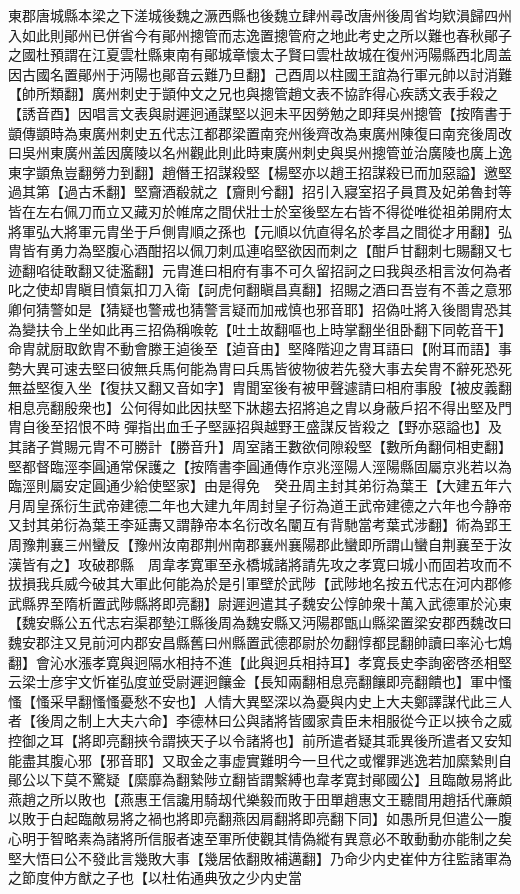 東郡唐城縣本梁之下溠城後魏之㵐西縣也後魏立肆州尋改唐州後周省均欵溳歸四州入如此則鄖州已併省今有鄖州摠管而志逸置摠管府之地此考史之所以難也春秋鄖子之國杜預謂在江夏雲杜縣東南有鄖城章懷太子賢曰雲杜故城在復州沔陽縣西北周盖因古國名置鄖州于沔陽也鄖音云難乃旦翻】己酉周以柱國王誼為行軍元帥以討消難【帥所類翻】廣州刺史于顗仲文之兄也與摠管趙文表不協詐得心疾誘文表手殺之【誘音酉】因唱言文表與尉遲迥通謀堅以迥未平因勞勉之即拜吳州摠管【按隋書于顗傳顗時為東廣州刺史五代志江都郡梁置南兖州後齊改為東廣州陳復曰南兖後周改曰吳州東廣州盖因廣陵以名州觀此則此時東廣州刺史與吳州摠管並治廣陵也廣上逸東字顗魚豈翻勞力到翻】趙僭王招謀殺堅【楊堅亦以趙王招謀殺已而加惡謚】邀堅過其第【過古禾翻】堅齎酒殽就之【齎則兮翻】招引入寢室招子員貫及妃弟魯封等皆在左右佩刀而立又藏刃於帷席之間伏壯士於室後堅左右皆不得從唯從祖弟開府太將軍弘大將軍元胄坐于戶側胄順之孫也【元順以伉直得名於孝昌之間從才用翻】弘胄皆有勇力為堅腹心酒酣招以佩刀刺瓜連啗堅欲因而刺之【酣戶甘翻刺七賜翻又七迹翻啗徒敢翻又徒濫翻】元胄進曰相府有事不可久留招訶之曰我與丞相言汝何為者叱之使却胄瞋目憤氣扣刀入衛【訶虎何翻瞋昌真翻】招賜之酒曰吾豈有不善之意邪卿何猜警如是【猜疑也警戒也猜警言疑而加戒慎也邪音耶】招偽吐將入後閤胄恐其為變扶令上坐如此再三招偽稱㗋乾【吐土故翻嘔也上時掌翻坐徂卧翻下同乾音干】命胄就厨取飲胄不動會滕王逌後至【逌音由】堅降階迎之胄耳語曰【附耳而語】事勢大異可速去堅曰彼無兵馬何能為胄曰兵馬皆彼物彼若先發大事去矣胄不辭死恐死無益堅復入坐【復扶又翻又音如字】胄聞室後有被甲聲遽請曰相府事殷【被皮義翻相息亮翻殷衆也】公何得如此因扶堅下牀趨去招將追之胄以身蔽戶招不得出堅及門胄自後至招恨不時彈指出血壬子堅誣招與越野王盛謀反皆殺之【野亦惡謚也】及其諸子賞賜元胄不可勝計【勝音升】周室諸王數欲伺隙殺堅【數所角翻伺相吏翻】堅都督臨涇李圓通常保護之【按隋書李圓通傳作京兆涇陽人涇陽縣固屬京兆若以為臨涇則屬安定圓通少給使堅家】由是得免　癸丑周主封其弟衍為葉王【大建五年六月周皇孫衍生武帝建德二年也大建九年周封皇子衍為道王武帝建德之六年也今静帝又封其弟衍為葉王李延夀又謂静帝本名衍改名闡互有背馳當考葉式涉翻】術為郢王　周豫荆襄三州蠻反【豫州汝南郡荆州南郡襄州襄陽郡此蠻即所謂山蠻自荆襄至于汝漢皆有之】攻破郡縣　周韋孝寛軍至永橋城諸將請先攻之孝寛曰城小而固若攻而不拔損我兵威今破其大軍此何能為於是引軍壁於武陟【武陟地名按五代志在河内郡修武縣界至隋析置武陟縣將即亮翻】尉遲迥遣其子魏安公惇帥衆十萬入武德軍於沁東【魏安縣公五代志宕渠郡墊江縣後周為魏安縣又沔陽郡甑山縣梁置梁安郡西魏改曰魏安郡注又見前河内郡安昌縣舊曰州縣置武德郡尉於勿翻惇都昆翻帥讀曰率沁七鴆翻】會沁水漲孝寛與迥隔水相持不進【此與迥兵相持耳】孝寛長史李詢密啓丞相堅云梁士彦宇文忻崔弘度並受尉遲迥饟金【長知兩翻相息亮翻饟即亮翻饋也】軍中慅慅【慅采早翻慅慅憂愁不安也】人情大異堅深以為憂與内史上大夫鄭譯謀代此三人者【後周之制上大夫六命】李德林曰公與諸將皆國家貴臣未相服從今正以挾令之威控御之耳【將即亮翻挾令謂挾天子以令諸將也】前所遣者疑其乖異後所遣者又安知能盡其腹心邪【邪音耶】又取金之事虚實難明今一旦代之或懼罪逃逸若加縻縶則自鄖公以下莫不驚疑【縻靡為翻縶陟立翻皆謂繫縛也韋孝寛封鄖國公】且臨敵易將此燕趙之所以敗也【燕惠王信讒用騎刼代樂毅而敗于田單趙惠文王聽間用趙括代亷頗以敗于白起臨敵易將之禍也將即亮翻燕因肩翻將即亮翻下同】如愚所見但遣公一腹心明于智略素為諸將所信服者速至軍所使觀其情偽縱有異意必不敢動動亦能制之矣堅大悟曰公不發此言幾敗大事【幾居依翻敗補邁翻】乃命少内史崔仲方往監諸軍為之節度仲方猷之子也【以杜佑通典攷之少内史當